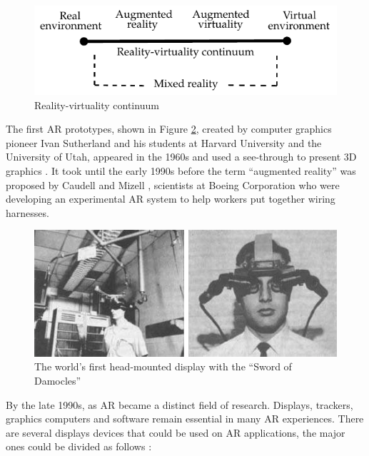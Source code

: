 \begin{figure}[!htb]
  \centering
  \includegraphics{chapters/basic_concepts/reality_continuum.pdf}
  \caption{Reality-virtuality continuum}
  \label{figure:reality_continuum}
\end{figure}

The first AR prototypes, shown in Figure \ref{figure:first_head_mount}, created by computer graphics pioneer Ivan Sutherland and his students at Harvard University and the University of Utah, appeared in the 1960s and used a see-through to present 3D graphics \cite{Benford1998}. It took until the early 1990s before the term ``augmented reality'' was proposed by Caudell and Mizell \cite{Benford1998}, scientists at Boeing Corporation who were developing an experimental AR system to help workers put together wiring harnesses.

\begin{figure}[!htb]
  \centering
  \includegraphics[width=\linewidth]{chapters/basic_concepts/first_head_mount.png}
  \caption{The world's first head-mounted display with the ``Sword of Damocles''}
  \label{figure:first_head_mount}
\end{figure}

By the late 1990s, as AR became a distinct field of research. Displays, trackers, graphics computers and software remain essential in many AR experiences. There are several displays devices that could be used on AR applications, the major ones could be divided as follows \cite{Benford1998}:

